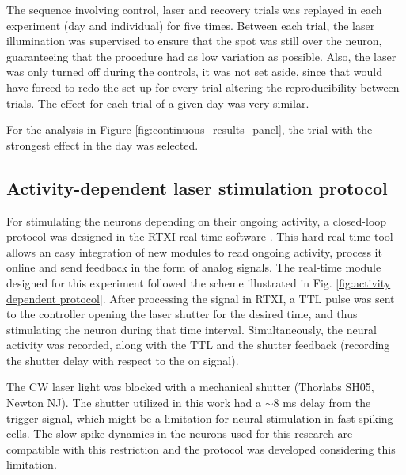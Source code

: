 The sequence involving control, laser and recovery trials was replayed in each experiment (day and individual) for five times. Between each trial, the laser illumination was supervised to ensure that the spot was still over the neuron, guaranteeing that the procedure had as low variation as possible. Also, the laser was only turned off during the controls, it was not set aside, since that would have forced to redo the set-up for every trial altering the reproducibility between trials. The effect for each trial of a given day was very similar. 


For the analysis in Figure \ref{fig:continuous_results_panel}, the trial with the strongest effect in the day was selected. 





\subsection{Activity-dependent laser stimulation protocol} 
\label{sect:methods-activity-dependent}

For stimulating the neurons depending on their ongoing activity, a closed-loop protocol was designed in the RTXI real-time software \parencite{patel_hard_2017}. This hard real-time tool allows an easy integration of new modules to read ongoing activity, process it online and send feedback in the form of analog signals. The real-time module designed for this experiment followed the scheme illustrated in Fig. \ref{fig:activity dependent protocol}. After processing the signal in RTXI, a TTL pulse was sent to the controller opening the laser shutter for the desired time, and thus stimulating the neuron during that time interval. Simultaneously, the neural activity was recorded, along with the TTL and the shutter feedback (recording the shutter delay with respect to the on signal).

The CW laser light was blocked with a mechanical shutter (Thorlabs SH05, Newton NJ). The shutter utilized in this work had a $\sim 8$ ms delay from the trigger signal, which might be a limitation for neural stimulation in fast spiking cells. The slow spike dynamics in the neurons used for this research are compatible with this restriction and the protocol was developed considering this limitation. 


